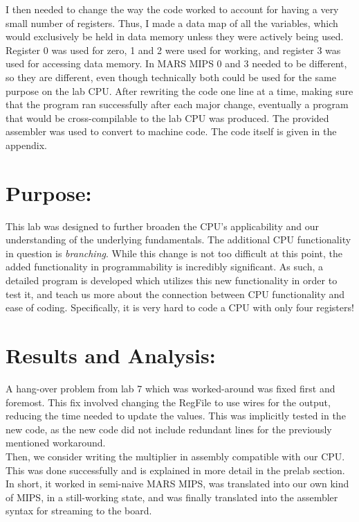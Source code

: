 \documentclass[12pt,a4paper]{article}
\begin{document}
I then needed to change the way the code worked to account for having a very small number
of registers. Thus, I made a data map of all the variables, which would exclusively be
held in data memory unless they were actively being used. Register 0 was used for zero,
1 and 2 were used for working, and register 3 was used for accessing data memory. In
MARS MIPS 0 and 3 needed to be different, so they are different, even though technically
both could be used for the same purpose on the lab CPU. After rewriting the code one line
at a time, making sure that the program ran successfully after each major change, eventually
a program that would be cross-compilable to the lab CPU was produced. The provided assembler
was used to convert to machine code. The code itself is given in the appendix.

\section*{Purpose:}

This lab was designed to further broaden the CPU's applicability and our understanding
of the underlying fundamentals. The additional CPU functionality in question is
\emph{branching}. While this change is not too difficult at this point, the added
functionality in programmability is incredibly significant. As such, a detailed program
is developed which utilizes this new functionality in order to test it, and teach us
more about the connection between CPU functionality and ease of coding. Specifically,
it is very hard to code a CPU with only four registers!

\section*{Results and Analysis:}

A hang-over problem from lab 7 which was worked-around was fixed first and foremost.
This fix involved changing the RegFile to use wires for the output, reducing the
time needed to update the values. This was implicitly tested in the new code, as the
new code did not include redundant lines for the previously mentioned workaround. \\

Then, we consider writing the multiplier in assembly compatible with our CPU. This
was done successfully and is explained in more detail in the prelab section. In short,
it worked in semi-naive MARS MIPS, was translated into our own kind of MIPS, in a 
still-working state, and was finally translated into the assembler syntax for streaming
to the board. \\
\end{document}
